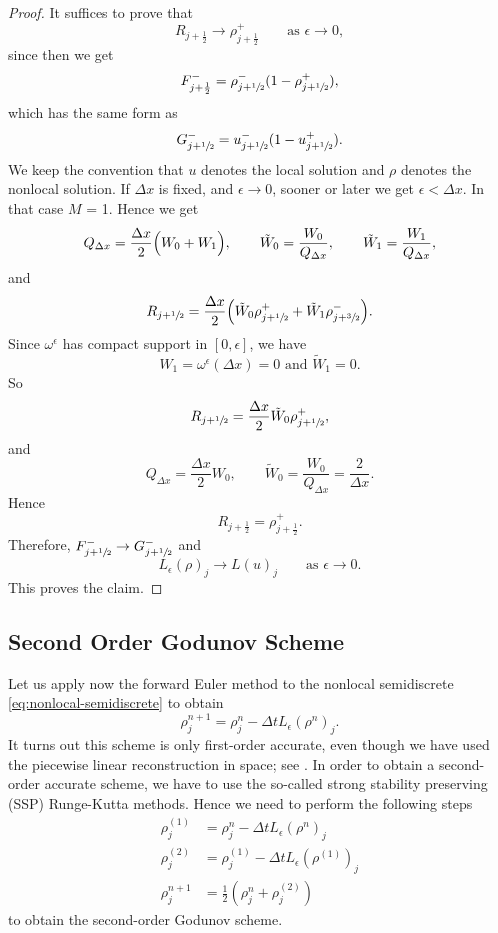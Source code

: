 \begin{proof}
    It suffices to prove that
    \[
        R_{j+\frac12} \to \rho_{j+\frac12}^+
        \qquad \text{as } \epsilon \to 0,
    \]
    since then we get
    \[
        F_{j+\frac12}^- = \rho_{j+\sfrac12}^-(1 - \rho_{j+\sfrac12}^+),
    \]
    which has the same form as
    \[
        G_{j+\sfrac12}^- = u_{j+\sfrac12}^-(1 - u_{j+\sfrac12}^+).
    \]
    We keep the convention that \(u\) denotes the local solution and \(\rho\) denotes the nonlocal solution. If $\Delta x$ is fixed, and $\epsilon \rightarrow 0$, sooner or later we get $ \epsilon < \Delta x$. In that case $M$ = 1. Hence we get
    \[Q_{\Delta x} = \frac{\Delta x}{2} \Bigl(W_0 + W_{1}\Bigr), \qquad \tilde{W}_0= \frac{W_0}{Q_{\Delta x}} , \qquad \tilde{W}_1= \frac{W_1}{Q_{\Delta x}},\]
    and
    \[ R_{j+\sfrac12} = \frac{\Delta x}{2} \Bigl( \tilde{W}_0 \rho_{j+\sfrac12}^+ + \tilde{W}_{1}\rho_{j+\sfrac32}^- \Bigr). \]
    Since $\omega^{\epsilon}$ has compact support in $[0,\epsilon]$, we have
    \[ W_1= \omega^{\epsilon}(\Delta x) = 0  \text{ and } \tilde{W}_1 = 0.\]
    So
    \[ R_{j+\sfrac12} = \frac{\Delta x}{2} \tilde{W}_0 \rho_{j+\sfrac12}^+, \]
    and
    \[Q_{\Delta x} = \frac{\Delta x}{2}W_0 , \qquad \tilde{W}_0= \frac{W_0}{Q_{\Delta x}} = \frac{2}{\Delta x}.\]
    Hence
    \[
        R_{j+\frac12} = \rho_{j+\frac12}^+.
    \]
    Therefore, \(F_{j+\sfrac12}^- \to G_{j+\sfrac12}^-\) and
    \[
        L_\epsilon(\rho)_j \to L(u)_j
        \qquad \text{as } \epsilon \to 0.
    \]
    This proves the claim.
\end{proof}
\subsection{Second Order Godunov Scheme}
Let us apply now the forward Euler method to the nonlocal semidiscrete \eqref{eq:nonlocal-semidiscrete} to obtain
\[
    \rho_{j}^{n+1} = \rho_{j}^n - \Delta t L_{\epsilon}(\rho^n)_j.
\]
It turns out this scheme is only first-order accurate, even though we have used the piecewise linear reconstruction in space; see \cite[p.~76]{Ulrik2015}. In order to obtain a second-order accurate scheme, we have to use the so-called strong stability preserving (SSP) Runge-Kutta methods. Hence we need to perform the following steps
\begin{equation}\label{eq:SSP-Godunov}
    \begin{split}
        \rho_{j}^{(1)} & =  \rho_{j}^n  - \Delta t L_{\epsilon}(\rho^n)_j           \\
        \rho_{j}^{(2)} & =   \rho_{j}^{(1)}   - \Delta t L_{\epsilon}(\rho^{(1)})_j \\
        \rho_{j}^{n+1} & = \frac{1}{2}(\rho_{j}^n +  \rho_{j}^{(2)})
    \end{split}
\end{equation}
to obtain the second-order Godunov scheme.


